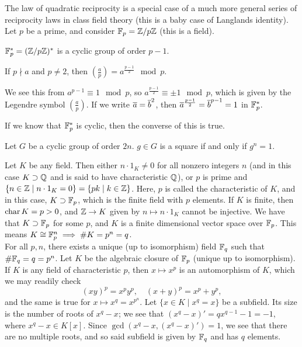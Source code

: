 \noindent The law of quadratic reciprocity is a special case of a much more general series of reciprocity laws in class field theory (this is a baby case of Langlands identity).
\\[8pt]
Let $p$ be a prime, and consider $\mathbb F_p = \mathbb Z/p\mathbb Z$ (this is a field).
\begin{lemma}
    $\mathbb F_p^\ast = (\mathbb Z/p\mathbb Z)^\ast$ is a cyclic group of order $p - 1$.
\end{lemma}
\begin{corollary}
    If $p \nmid a$ and $p \neq 2$, then $(\frac{a}{p}) = a^{\frac{p-1}{2}} \mod p$.
\end{corollary}
\noindent We see this from $a^{p-1} \equiv 1 \mod p$, so $a^{\frac{p-1}{2}} \equiv \pm 1 \mod p$, which is given by the Legendre symbol $(\frac{a}{p})$. If we write $\overline a = \overline b^2$, then $\overline a^{\frac{p-1}{2}} = \overline b^{p - 1} = 1$ in $\mathbb F_p^\ast$.
\begin{exercise}
    If we know that $\mathbb F_p^\ast$ is cyclic, then the converse of this is true.
\end{exercise}
\begin{lemma}
    Let $G$ be a cyclic group of order $2n$. $g \in G$ is a square if and only if $g^n = 1$.
\end{lemma}
\noindent Let $K$ be any field. Then either $n \cdot 1_K \neq 0$ for all nonzero integers $n$ (and in this case $K \supset \mathbb Q$ and is said to have characteristic $\mathbb Q$), or $p$ is prime and $\{n \in \mathbb Z \mid n \cdot 1_K = 0\} = \{pk \mid k \in \mathbb Z\}$. Here, $p$ is called the characteristic of $K$, and in this case, $K \supset \mathbb F_p$, which is the finite field with $p$ elements. If $K$ is finite, then $\operatorname{char} K = p > 0$, and $\mathbb Z \to K$ given by $n \mapsto n \cdot 1_K$ cannot be injective. We have that $K \supset \mathbb F_p$ for some $p$, and $K$ is a finite dimensional vector space over $\mathbb F_p$. This means $K \cong \mathbb F_p^n \implies \#K = p^n = q$.
\\[8pt]
For all $p, n$, there exists a unique (up to isomorphism) field $\mathbb F_q$ such that $\# \mathbb F_q = q = p^n$. Let $K$ be the algebraic closure of $\mathbb F_p$ (unique up to isomorphism). If $K$ is any field of characteristic $p$, then $x \mapsto x^p$ is an automorphism of $K$, which we may readily check
\[ (xy)^p = x^py^p, \quad (x + y)^p = x^p + y^p, \]
and the same is true for $x \mapsto x^q = x^{p^n}$. Let $\{x \in K \mid x^q = x\}$ be a subfield. Its size is the number of roots of $x^q - x$; we see that $(x^q - x)' = qx^{q-1} - 1 = -1$, where $x^q - x \in K[x]$.  Since $\gcd(x^q - x, (x^q - x)') = 1$, we see that there are no multiple roots, and so said subfield is given by $\mathbb F_q$ and has $q$ elements.
